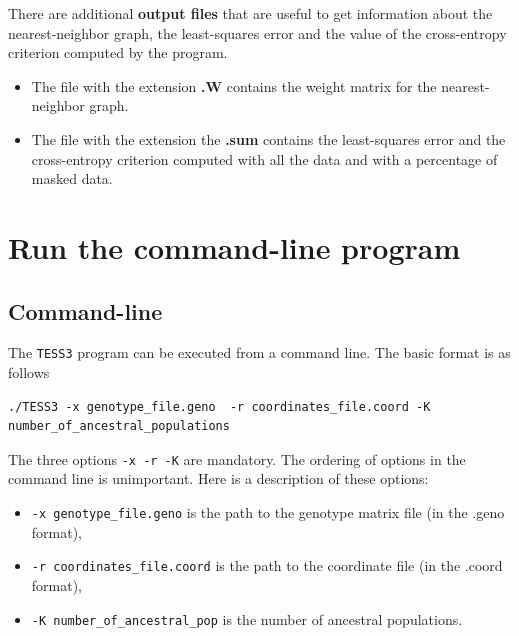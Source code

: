 \documentclass[12pt,a4paper]{article}
\begin{document}
There are additional {\bf output files} that are useful to get information about 
the nearest-neighbor graph, the least-squares error and the value of the cross-entropy 
criterion computed by the program.

\begin{itemize}
\item The file with the extension {\bf .W} contains the weight matrix for the 
nearest-neighbor graph.
\item The file with the extension the {\bf .sum} contains the 
least-squares error and the cross-entropy criterion computed with all the data and 
with a percentage of masked data.
\end{itemize}

\section{Run the command-line program}
\subsection{Command-line}
The {\tt TESS3} program can be executed from a command line. The basic format is 
as follows
\begin{Verbatim}[frame=single]
./TESS3 -x genotype_file.geno  -r coordinates_file.coord -K number_of_ancestral_populations
\end{Verbatim}

\noindent
The three options {\tt -x -r -K}  are mandatory. The ordering of 
options in the command line is unimportant. Here is a description of these 
options:
\begin{itemize}
\item \verb|-x genotype_file.geno| is the path to the genotype matrix file (in the 
.geno format),
\item \verb|-r coordinates_file.coord| is the path to the coordinate file (in 
the .coord format),
\item \verb|-K number_of_ancestral_pop| is the number of ancestral 
populations.
\end{itemize}
\end{document}
